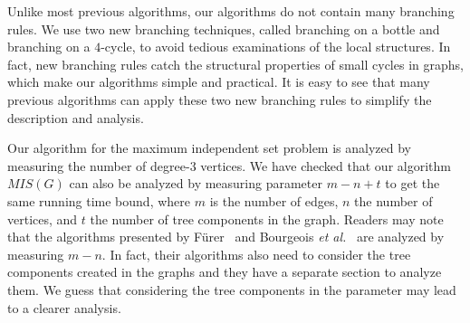 \documentclass[runningheads]{llncs}
\begin{document}
Unlike most previous algorithms, our algorithms do not contain
many branching rules. We use two new branching techniques, called
branching on a bottle and branching on a $4$-cycle, to avoid
tedious examinations of the local structures. In fact, new
branching rules catch the structural properties of small cycles in
graphs, which make our algorithms simple and practical. It is easy
to see that many previous algorithms can apply these two new
branching rules to simplify the description and analysis.

Our algorithm for the maximum independent set problem is analyzed
by measuring the number of degree-$3$ vertices. We have checked
that our algorithm $MIS(G)$ can also be analyzed by measuring
parameter $m-n+t$ to get the same running time bound, where $m$ is
the number of edges, $n$ the number of vertices, and $t$ the
number of tree components in the graph. Readers may note that the
algorithms presented by F{\"u}rer~\cite{Furer:ISsparse} and
Bourgeois \emph{et al.}~\cite{Bourgeois:3IS} are analyzed by
measuring $m-n$. In fact, their algorithms also need to consider
the tree components created in the graphs and they have a separate
section to analyze them. We guess that considering the tree
components in the parameter may lead to a clearer analysis.
\end{document}

